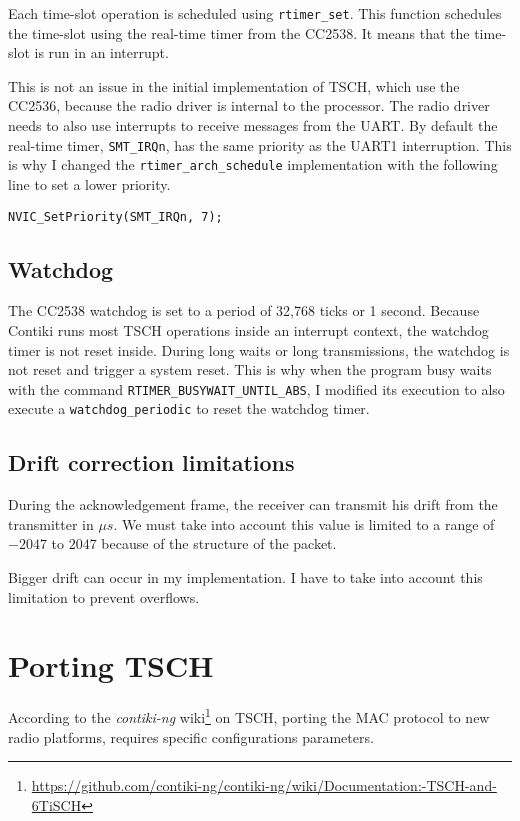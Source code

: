 Each time-slot operation is scheduled using \lstinline{rtimer_set}.
This function schedules the time-slot using the real-time timer from the CC2538.
It means that the time-slot is run in an interrupt.

This is not an issue in the initial implementation of TSCH, which use the
CC2536, because the radio driver is internal to the processor.
The radio driver needs to also use interrupts to receive messages from the UART.
By default the real-time timer, \lstinline{SMT_IRQn}, has the same priority as
the UART1 interruption. 
This is why I changed the \lstinline{rtimer_arch_schedule} implementation with
the following line to set a lower priority.

\begin{lstlisting}
NVIC_SetPriority(SMT_IRQn, 7); 
\end{lstlisting}

\subsection{Watchdog}

The CC2538 watchdog is set to a period of 32,768 ticks or 1 second. 
Because Contiki runs most TSCH operations inside an interrupt
context, the watchdog timer is not reset inside.
During long waits or long transmissions, the watchdog is not reset and trigger
a system reset.
This is why when the program busy waits with the command
\lstinline{RTIMER_BUSYWAIT_UNTIL_ABS}, I modified its execution to also execute
a \lstinline{watchdog_periodic} to reset the watchdog timer.

\subsection{Drift correction limitations}

During the acknowledgement frame, the receiver can transmit his drift from the
transmitter in $\mu s$. 
We must take into account this value is limited to a range of $-2047$ to
$2047$ because of the structure of the packet.

Bigger drift can occur in my implementation. 
I have to take into account this limitation to prevent overflows.

\section{Porting TSCH}

According to the \emph{contiki-ng}
wiki\footnote{\url{https://github.com/contiki-ng/contiki-ng/wiki/Documentation:-TSCH-and-6TiSCH}}
on TSCH, porting the MAC protocol to new radio platforms, requires specific
configurations parameters.

